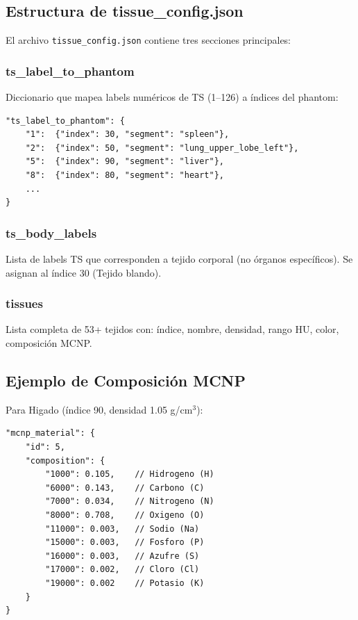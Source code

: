 \documentclass[12pt,a4paper]{article}
\begin{document}
\subsection{Estructura de tissue\_config.json}

El archivo \texttt{tissue\_config.json} contiene tres secciones principales:

\subsubsection{ts\_label\_to\_phantom}

Diccionario que mapea labels numéricos de TS (1--126) a índices del phantom:

\begin{lstlisting}
"ts_label_to_phantom": {
    "1":  {"index": 30, "segment": "spleen"},
    "2":  {"index": 50, "segment": "lung_upper_lobe_left"},
    "5":  {"index": 90, "segment": "liver"},
    "8":  {"index": 80, "segment": "heart"},
    ...
}
\end{lstlisting}

\subsubsection{ts\_body\_labels}

Lista de labels TS que corresponden a tejido corporal (no órganos específicos).
Se asignan al índice 30 (Tejido blando).

\subsubsection{tissues}

Lista completa de 53+ tejidos con: índice, nombre, densidad, rango HU, color, composición MCNP.

\subsection{Ejemplo de Composición MCNP}

Para Higado (índice 90, densidad 1.05 g/cm$^3$):

\begin{lstlisting}
"mcnp_material": {
    "id": 5,
    "composition": {
        "1000": 0.105,    // Hidrogeno (H)
        "6000": 0.143,    // Carbono (C)
        "7000": 0.034,    // Nitrogeno (N)
        "8000": 0.708,    // Oxigeno (O)
        "11000": 0.003,   // Sodio (Na)
        "15000": 0.003,   // Fosforo (P)
        "16000": 0.003,   // Azufre (S)
        "17000": 0.002,   // Cloro (Cl)
        "19000": 0.002    // Potasio (K)
    }
}
\end{lstlisting}
\end{document}
